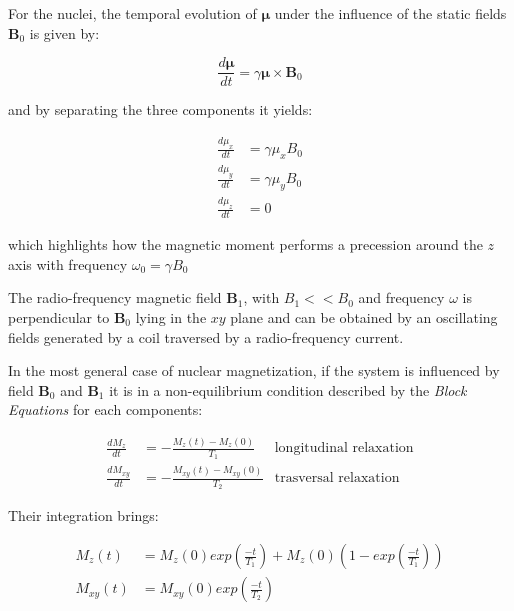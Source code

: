 \documentclass[12pt,a4paper]{report}
\begin{document}
For the nuclei, the temporal evolution of $\bm{\mu}$ under the influence of the static fields $\bm{B}_0$ is given by:

\begin{equation}
  \frac{d \bm{\mu}}{d t} = \gamma \bm{\mu} \times \bm{B}_0
\end{equation}

and by separating the three components it yields:

\begin{align}
  \frac{d \mu_x}{d t} &= \gamma \mu_x B_0 \\ 
  \frac{d \mu_y}{d t} &= \gamma \mu_y B_0 \\
  \frac{d \mu_z}{d t} &= 0
\end{align}

which highlights how the magnetic moment performs a precession around the $z$ axis with frequency $\omega_0 = \gamma B_0$

The radio-frequency magnetic field $\bm{B}_1$, with $B_1 << B_0$ and frequency $\omega$ is perpendicular to $\bm{B}_0$ lying in the $xy$ plane and can be obtained by an oscillating fields generated by a coil traversed by a radio-frequency current.

In the most general case of nuclear magnetization, if the system is influenced by field $\bm{B}_0$ and $\bm{B}_1$ it is in a non-equilibrium condition described by the {\it Block Equations} for each components:

\begin{align}
 \frac{d M_{z}}{d t}  &= - \frac{M_z(t) - M_z(0)}{T_1} & \mbox{longitudinal relaxation}\\
 \frac{d M_{xy}}{d t} &= - \frac{M_{xy}(t) - M_{xy}(0)}{T_2} & \mbox{trasversal relaxation}
\end{align}

Their integration brings: 

\begin{align}
 M_z(t)    &= M_z(0)exp\left(\frac{-t}{T_1}\right) + M_z(0)\left(1 - exp\left(\frac{-t}{T_1}\right)\right) \\
 M_{xy}(t) &= M_{xy}(0)exp\left(\frac{-t}{T_2}\right)
\end{align}
\end{document}
